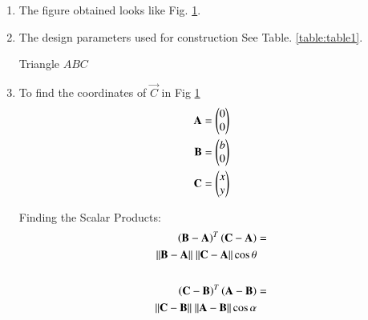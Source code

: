 \renewcommand{\theequation}{\theenumi}
\begin{enumerate}[label=\thesection.\arabic*.,ref=\thesection.\theenumi]

\begin{figure}[!ht]
\centering
\resizebox{\columnwidth}{!}{}
\caption{Triangle by Latex-Tikz}
\label{fig:triangle}	
\end{figure}

\item The figure obtained looks like Fig. \ref{fig:triangle}.\\ 

\item The design parameters used for construction See Table. \ref{table:table1}.
\begin{table}[ht!]
\centering

\caption{Triangle $ABC$}
\label{table:table1}	
\end{table} 

\item To find the coordinates of $\vec{C}$ in Fig \ref{fig:triangle}\\
\solution
\begin{align}
\mathbf{A} &=\begin{pmatrix}0\\0\end{pmatrix} \label{eq:constr_a}\\
\mathbf{B} &=\begin{pmatrix}b\\0\end{pmatrix} \label{eq:constr_b}\\
\mathbf{C} &=\begin{pmatrix}x\\y\end{pmatrix} \label{eq:constr_c}
\end{align}

Finding the Scalar Products:
\begin{align}
\begin{split}\label{eq:scalar1}
\left(\mathbf{B} - \mathbf{A}\right)^T\left(\mathbf{C}-\mathbf{A}\right) &= \\ \|\mathbf{B} - \mathbf{A}\|
\ \| \mathbf{C}-\mathbf{A} \| \cos{\theta}
\end{split}\\ \nonumber\\
\begin{split}\label{eq:scalar2}
\left(\mathbf{C} - \mathbf{B}\right)^T\left(\mathbf{A}-\mathbf{B}\right) &= \\ 
\|\mathbf{C} - \mathbf{B}\|\ \| \mathbf{A}-\mathbf{B} \| \cos{\alpha}
\end{split}
\end{align}


\end{enumerate}
